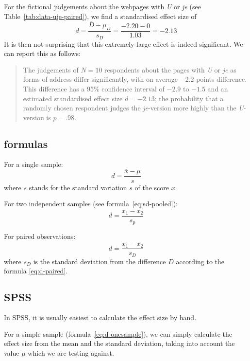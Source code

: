 \documentclass[
]{book}
\begin{document}
For the fictional judgements about the webpages with \emph{U} or \emph{je} (see
Table~\ref{tab:data-uje-paired}), we find a standardised
effect size of
\[d = \frac{ \overline{D}-\mu_D} {s_D} = \frac{ -2.20-0 } {1.03} = -2.13\]
It is then not surprising that this extremely large effect is indeed
significant. We can report this as follows:

\begin{quote}
The judgements of \(N=10\) respondents about the pages with \emph{U} or \emph{je}
as forms of address differ significantly, with on average \(-2.2\) points
difference. This difference has a 95\% confidence interval of
\(-2.9\) to \(-1.5\) and an estimated standardised effect size
\(d=-2.13\); the probability that a randomly chosen respondent
judges the \emph{je}-version more highly than the \emph{U}-version is \(p=.98\).
\end{quote}

\subsection{formulas}\label{sec:formulas13-5}

For a single sample:
\begin{equation}
   \label{eq:d-onesample}
  d = \frac{\overline{x}-\mu}{s}
\end{equation}
where \(s\) stands for the standard variation \(s\)
of the score \(x\).

For two independent samples (see
formula~\eqref{eq:sd-pooled}):
\begin{equation}
  \label{eq:d-homoskedastic}
  d = \frac{ \overline{x_1}-\overline{x_2} } { s_p }
\end{equation}

For paired observations:
\begin{equation}
  \label{eq:d-paired}
  d = \frac{ \overline{x_1}-\overline{x_2} } { s_D }
\end{equation}
where \(s_D\) is the
standard deviation from the difference \(D\) according
to the formula \eqref{eq:d-paired}.

\subsection{SPSS}\label{spss-13-2}

In SPSS, it is usually easiest to calculate the effect size
by hand.

For a simple sample
(formula~\eqref{eq:d-onesample}), we can simply calculate the
effect size from the mean and the standard deviation, taking into account
the value \(\mu\) which we are testing against.
\end{document}
